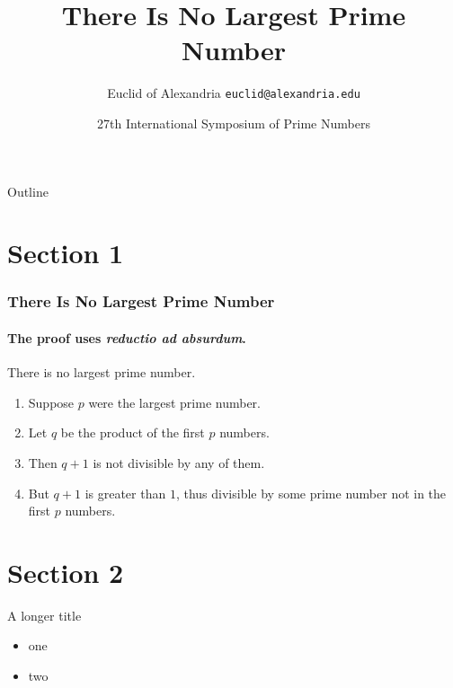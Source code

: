 \documentclass{beamer}
\title{There Is No Largest Prime Number}
\date[ISPN ’80]{27th International Symposium of Prime Numbers}
\author[Euclid]{Euclid of Alexandria \texttt{euclid@alexandria.edu}}
\begin{document}
\begin{frame}
\titlepage
\end{frame}

\begin{frame}{Outline}
    \tableofcontents
\end{frame}

\section{Section 1}
\begin{frame} 
    \frametitle{There Is No Largest Prime Number} 
    \framesubtitle{The proof uses \textit{reductio ad absurdum}.} 
    \begin{theorem}
    There is no largest prime number. \end{theorem} 
    \begin{enumerate} 
        \item<1-| alert@1> Suppose $p$ were the largest prime number. 
        \item<2-> Let $q$ be the product of the first $p$ numbers. 
        \item<3-> Then $q+1$ is not divisible by any of them. 
        \item<1-> But $q + 1$ is greater than $1$, thus divisible by some prime
            number not in the first $p$ numbers.
    \end{enumerate}
\end{frame}

\section{Section 2}
\begin{frame}{A longer title}
    \begin{itemize}
        \item one
        \item two
    \end{itemize}
\end{frame}
\end{document}
